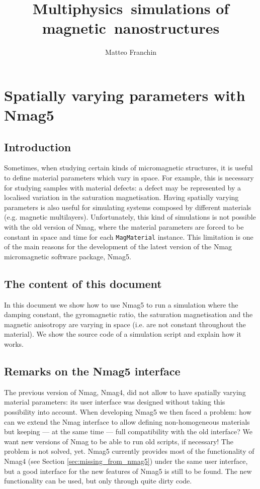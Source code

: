 \documentclass[11pt,oneside,openany]{article}
\author{Matteo Franchin}
\title{Multiphysics~simulations of magnetic~nanostructures}
\begin{document}
\titlepage

\section{Spatially varying parameters with Nmag5}

\subsection{Introduction}
Sometimes, when studying certain kinds of micromagnetic structures, it is
useful to define material parameters which vary in space. For example, this is
necessary for studying samples with material defects: a defect may be
represented by a localised variation in the saturation magnetisation.  Having
spatially varying parameters is also useful for simulating systems composed by
different materials (e.g. magnetic multilayers).
Unfortunately, this kind of simulations is not possible with the old version of
Nmag, where the material parameters are forced to be constant in space and time
for each \verb|MagMaterial| instance. This limitation is one of the main
reasons for the development of the latest version of the Nmag micromagnetic
software package, Nmag5.

\subsection{The content of this document}
In this document we show how to use Nmag5 to run a simulation where the damping
constant, the gyromagnetic ratio, the saturation magnetisation and the magnetic
anisotropy are varying in space (i.e. are not constant throughout the
material).  We show the source code of a simulation script and explain how it
works.

\subsection{Remarks on the Nmag5 interface}
The previous version of Nmag, Nmag4, did not allow to have spatially varying
material parameters: its user interface was designed without taking this
possibility into account. When developing Nmag5 we then faced a problem: how
can we extend the Nmag interface to allow defining non-homogeneous materials
but keeping --- at the same time --- full compatibility with the old interface?
We want new versions of Nmag to be able to run old scripts, if necessary! The
problem is not solved, yet. Nmag5 currently provides most of the functionality
of Nmag4 (see Section \ref{sec:missing_from_nmag5}) under the same user
interface, but a good interface for the new features of Nmag5 is still to be
found.  The new functionality can be used, but only through quite dirty code.
\end{document}
